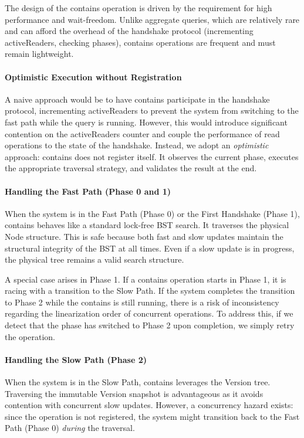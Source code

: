 \documentclass[acmsmall,screen,nonacm]{acmart}
\newcommand{\codestyle}[1]{{{\fontsize{9}{10}\ttfamily #1}}}
\begin{document}
The design of the \codestyle{contains} operation is driven by the requirement for high performance and wait-freedom. Unlike aggregate queries, which are relatively rare and can afford the overhead of the handshake protocol (incrementing \codestyle{activeReaders}, checking phases), \codestyle{contains} operations are frequent and must remain lightweight.

\paragraph{Optimistic Execution without Registration}
A naive approach would be to have \codestyle{contains} participate in the handshake protocol, incrementing \codestyle{activeReaders} to prevent the system from switching to the fast path while the query is running. However, this would introduce significant contention on the \codestyle{activeReaders} counter and couple the performance of read operations to the state of the handshake. Instead, we adopt an \textit{optimistic} approach: \codestyle{contains} does not register itself. It observes the current phase, executes the appropriate traversal strategy, and validates the result at the end.

\paragraph{Handling the Fast Path (Phase 0 and 1)}
When the system is in the Fast Path (Phase 0) or the First Handshake (Phase 1), \codestyle{contains} behaves like a standard lock-free BST search. It traverses the physical \codestyle{Node} structure. This is safe because both fast and slow updates maintain the structural integrity of the BST at all times. Even if a slow update is in progress, the physical tree remains a valid search structure.

A special case arises in Phase 1. If a \codestyle{contains} operation starts in Phase 1, it is racing with a transition to the Slow Path. If the system completes the transition to Phase 2 while the \codestyle{contains} is still running, there is a risk of inconsistency regarding the linearization order of concurrent operations. To address this, if we detect that the phase has switched to Phase 2 upon completion, we simply retry the operation.

\paragraph{Handling the Slow Path (Phase 2)}
When the system is in the Slow Path, \codestyle{contains} leverages the \codestyle{Version} tree. Traversing the immutable \codestyle{Version} snapshot is advantageous as it avoids contention with concurrent slow updates. However, a concurrency hazard exists: since the operation is not registered, the system might transition back to the Fast Path (Phase 0) \textit{during} the traversal.
\end{document}

